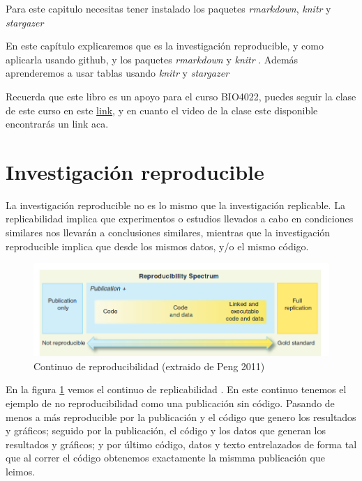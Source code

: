\documentclass[]{book}
\begin{document}
Para este capitulo necesitas tener instalado los paquetes
\emph{rmarkdown}, \emph{knitr} y \emph{stargazer}

En este capítulo explicaremos que es la investigación reproducible, y
como aplicarla usando github, y los paquetes \emph{rmarkdown}
\citep{Allaire2018} y \emph{knitr} \citep{xie2015}. Además aprenderemos
a usar tablas usando \emph{knitr} \citep{xie2015} y \emph{stargazer}
\citep{hlavak2018}

Recuerda que este libro es un apoyo para el curso BIO4022, puedes seguir
la clase de este curso en este
\href{https://derek-corcoran-barrios.github.io/Clase2/Clase2InvestigacionReproducible}{link},
y en cuanto el video de la clase este disponible encontrarás un link
aca.

\hypertarget{investigacion-reproducible}{%
\section{Investigación reproducible}\label{investigacion-reproducible}}

La investigación reproducible no es lo mismo que la investigación
replicable. La replicabilidad implica que experimentos o estudios
llevados a cabo en condiciones similares nos llevarán a conclusiones
similares, mientras que la investigación reproducible implica que desde
los mismos datos, y/o el mismo código.

\begin{figure}

{\centering \includegraphics[width=0.8\linewidth]{Reproducible} 

}

\caption{Continuo de reproducibilidad (extraido de Peng 2011)}\label{fig:reproducible}
\end{figure}

En la figura \ref{fig:reproducible} vemos el continuo de replicabilidad
\citep{peng2011reproducible}. En este continuo tenemos el ejemplo de no
reproducibilidad como una publicación sin código. Pasando de menos a más
reproducible por la publicación y el código que genero los resultados y
gráficos; seguido por la publicación, el código y los datos que generan
los resultados y gráficos; y por último código, datos y texto
entrelazados de forma tal que al correr el código obtenemos exactamente
la mismma publicación que leimos.
\end{document}
